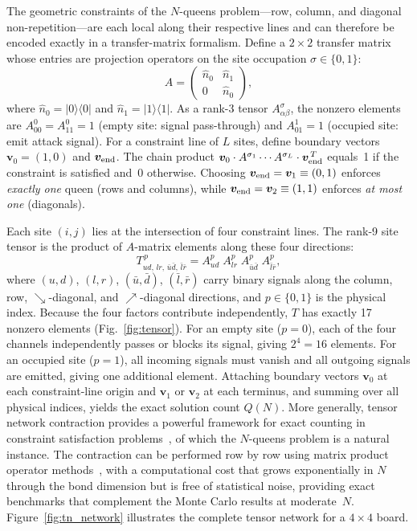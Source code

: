 \documentclass[aps, pre, reprint, amsmath, amssymb, superscriptaddress, floatfix]{revtex4-2}
\begin{document}
The geometric constraints of the $N$-queens problem---row, column,
and diagonal non-repetition---are each local along their respective
lines and can therefore be encoded exactly in a transfer-matrix
formalism.
Define a $2\times 2$ transfer matrix whose entries are projection
operators on the site occupation $\sigma\in\{0,1\}$:
\begin{equation}
  A = \begin{pmatrix} \hat{n}_0 & \hat{n}_1 \\[2pt]
  0 & \hat{n}_0 \end{pmatrix},
  \label{eq:Amat}
\end{equation}
where $\hat{n}_0 = |0\rangle\langle 0|$ and
$\hat{n}_1 = |1\rangle\langle 1|$.
As a rank-3 tensor $A_{\alpha\beta}^{\sigma}$, the nonzero elements
are $A_{00}^{0} = A_{11}^{0} = 1$ (empty site: signal pass-through)
and $A_{01}^{1} = 1$ (occupied site: emit attack signal).
For a constraint line of $L$ sites, define boundary vectors
$\bm{v}_0 = (1,0)$ and $\bm{v}_{\rm end}$.  The chain product
$\bm{v}_0 \cdot A^{\sigma_1}\cdots A^{\sigma_L}\cdot
\bm{v}_{\rm end}^{\,T}$
equals~1 if the constraint is satisfied and~0 otherwise.
Choosing $\bm{v}_{\rm end} = \bm{v}_1 \equiv (0,1)$ enforces
\emph{exactly one} queen (rows and columns), while
$\bm{v}_{\rm end} = \bm{v}_2 \equiv (1,1)$ enforces \emph{at most
one} (diagonals).

Each site $(i,j)$ lies at the intersection of four constraint lines.
The rank-9 site tensor is the product of $A$-matrix elements along
these four directions:
\begin{equation}
  T_{ud,\,lr,\,\bar{u}\bar{d},\,\bar{l}\bar{r}}^{\,p}
  = A_{ud}^{p}\;A_{lr}^{p}\;A_{\bar{u}\bar{d}}^{p}\;
    A_{\bar{l}\bar{r}}^{p},
  \label{eq:Ttensor}
\end{equation}
where $(u,d)$, $(l,r)$, $(\bar{u},\bar{d})$, $(\bar{l},\bar{r})$
carry binary signals along the column, row, $\searrow$-diagonal, and
$\nearrow$-diagonal directions, and $p\in\{0,1\}$ is the physical
index.  Because the four factors contribute independently, $T$ has
exactly 17 nonzero elements (Fig.~\ref{fig:tensor}).
For an empty site ($p = 0$), each of the four channels independently
passes or blocks its signal, giving $2^4 = 16$ elements.
For an occupied site ($p = 1$), all incoming signals must vanish and
all outgoing signals are emitted, giving one additional element.
Attaching boundary vectors $\bm{v}_0$ at each constraint-line origin
and $\bm{v}_1$ or $\bm{v}_2$ at each terminus, and summing over all
physical indices, yields the exact solution count $Q(N)$.
More generally, tensor network contraction provides a powerful
framework for exact counting in constraint satisfaction
problems~\cite{Kourtis2019}, of which the $N$-queens problem is a
natural instance.
The contraction can be performed row by row
using matrix product operator methods~\cite{Xiang2024}, with a
computational cost that grows exponentially in $N$ through the bond
dimension but is free of statistical noise, providing exact
benchmarks that complement the Monte Carlo results at moderate~$N$.
Figure~\ref{fig:tn_network} illustrates the complete tensor network
for a $4\times 4$ board.
\end{document}
